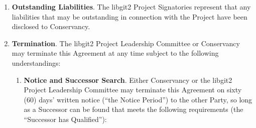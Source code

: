 \documentclass[letterpaper,12pt]{article}
\newcommand{\signatories}{libgit2 Project Signatories\xspace}
\newcommand{\leadershipbody}{libgit2 Project Leadership Committee\xspace}
\begin{document}
\begin{enumerate}[label=\arabic*.,ref=\S~\arabic*]
\item \textbf{Outstanding Liabilities}. The \signatories represent
that any liabilities that may be outstanding in connection with the
Project have been disclosed to Conservancy. 
\item \textbf{Termination}. \label{Termination} The \leadershipbody or Conservancy
may terminate this Agreement at any time subject to the following
understandings:


\begin{enumerate}[label=\alph*.,ref=\theenumi(\arabic*)]

\item \textbf{Notice and Successor Search}. Either Conservancy or the \leadershipbody
may terminate this Agreement on sixty (60) days' written notice (``the Notice Period'') to
the other Party, so long as a Successor can be found that meets the
following requirements (the ``Successor has Qualified''):



\end{enumerate}
\end{enumerate}
\end{document}
